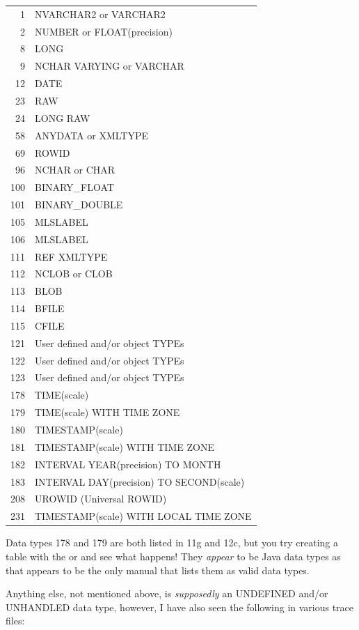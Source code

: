\begin{appendix}
\begin{longtable}[]{@{}r|l@{}}
1 & NVARCHAR2 or VARCHAR2 \\
2 & NUMBER or FLOAT(precision) \\
8 & LONG \\
9 & NCHAR VARYING or VARCHAR \\
12 & DATE \\
23 & RAW \\
24 & LONG RAW \\
58 & ANYDATA or XMLTYPE \\
69 & ROWID \\
96 & NCHAR or CHAR \\
100 & BINARY\_FLOAT \\
101 & BINARY\_DOUBLE \\
105 & MLSLABEL \\
106 & MLSLABEL \\
111 & REF XMLTYPE \\
112 & NCLOB or CLOB \\
113 & BLOB \\
114 & BFILE \\
115 & CFILE \\
121 & User defined and/or object TYPEs \\
122 & User defined and/or object TYPEs \\
123 & User defined and/or object TYPEs \\
178 & TIME(scale) \\
179 & TIME(scale) WITH TIME ZONE \\
180 & TIMESTAMP(scale) \\
181 & TIMESTAMP(scale) WITH TIME ZONE \\
182 & INTERVAL YEAR(precision) TO MONTH \\
183 & INTERVAL DAY(precision) TO SECOND(scale) \\
208 & UROWID (Universal ROWID)\\
231 & TIMESTAMP(scale) WITH LOCAL TIME ZONE \\

\bottomrule
\end{longtable}

\begin{note}
Data types 178 and 179 are both listed in 11g and 12c, but you try creating a table with the  or  and see what happens! They \emph{appear} to be Java data types as that appears to be the only manual that lists them as valid data types.
\end{note}

Anything else, not mentioned above, is \emph{supposedly} an UNDEFINED and/or UNHANDLED data type, however, I have also seen the following in various trace files:


\end{appendix}

